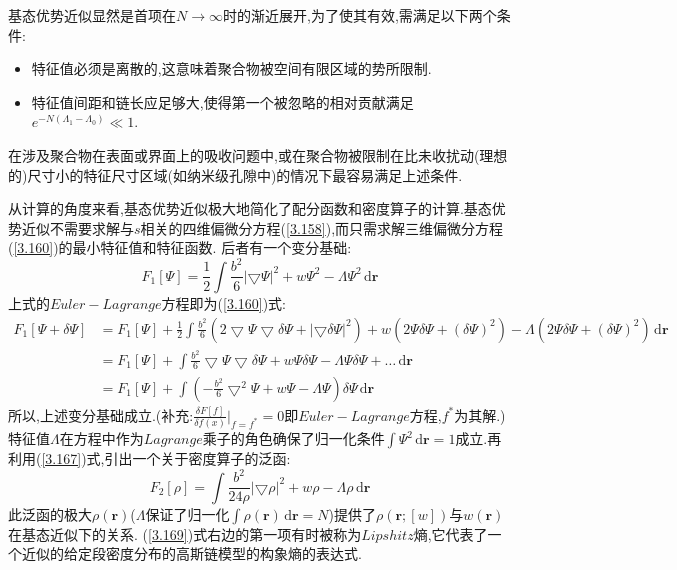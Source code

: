 基态优势近似显然是首项在$N\rightarrow\infty$时的渐近展开,为了使其有效,需满足以下两个条件:
\begin{itemize}
	\item 特征值必须是离散的,这意味着聚合物被空间有限区域的势所限制.
	\item 特征值间距和链长应足够大,使得第一个被忽略的相对贡献满足$e^{-N(\Lambda_1-\Lambda_0)} \ll 1$.
\end{itemize}
在涉及聚合物在表面或界面上的吸收问题中,或在聚合物被限制在比未收扰动(理想的)尺寸小的特征尺寸区域(如纳米级孔隙中)的情况下最容易满足上述条件.

从计算的角度来看,基态优势近似极大地简化了配分函数和密度算子的计算.基态优势近似不需要求解与$s$相关的四维偏微分方程(\ref{3.158}),而只需求解三维偏微分方程(\ref{3.160})的最小特征值和特征函数.
后者有一个变分基础:
\begin{equation}
F_1[\Psi] = \frac{1}{2} \int \frac{b^2}{6} |\bigtriangledown \Psi|^2 +w{\Psi}^2 -\Lambda {\Psi}^2\,\mathrm{d}\mathbf{r}
\end{equation}
上式的$Euler-Lagrange$方程即为(\ref{3.160})式:
$$
\begin{aligned}
F_1 [\Psi+\delta \Psi] &= F_1 [\Psi] + \frac{1}{2} \int \frac{b^2}{6}(2\bigtriangledown \Psi \bigtriangledown \delta\Psi+|\bigtriangledown \delta\Psi|^2)+w(2\Psi \delta\Psi+(\delta \Psi)^2)-\Lambda(2\Psi \delta\Psi+(\delta \Psi)^2)\,\mathrm{d}\mathbf{r}\\
 &= F_1 [\Psi] + \int \frac{b^2}{6} \bigtriangledown \Psi \bigtriangledown \delta\Psi+w \Psi \delta\Psi-\Lambda \Psi \delta\Psi+\dots\,\mathrm{d}\mathbf{r}\\
 &= F_1 [\Psi] + \int (- \frac{b^2}{6}\bigtriangledown^2 \Psi +w\Psi -\Lambda\Psi)\delta\Psi\,\mathrm{d}\mathbf{r}
\end{aligned}
$$
所以,上述变分基础成立.(补充:$\frac{\delta F[f]}{\delta f(x)} |_{f=f^*} = 0$即$Euler-Lagrange$方程,$f^*$为其解.)
特征值$\Lambda$在方程中作为$Lagrange$乘子的角色确保了归一化条件$\int \Psi^2 \,\mathrm{d}\mathbf{r} = 1$成立.再利用(\ref{3.167})式,引出一个关于密度算子的泛函:
\begin{equation}
F_2[\rho] = \int \frac{b^2}{24\rho}|\bigtriangledown\rho|^2+w\rho-\Lambda\rho\,\mathrm{d}\mathbf{r}\label{3.169}
\end{equation}
此泛函的极大$\rho(\mathbf{r})$($\Lambda$保证了归一化$\int \rho(\mathbf{r})\,\mathrm{d}\mathbf{r} = N$)提供了$\rho(\mathbf{r};[w])$与$w(\mathbf{r})$在基态近似下的关系.
(\ref{3.169})式右边的第一项有时被称为$Lipshitz$熵,它代表了一个近似的给定段密度分布的高斯链模型的构象熵的表达式.

